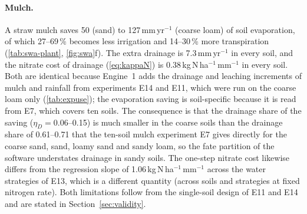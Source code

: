 \paragraph{Mulch.} A straw mulch saves 50 (sand) to 127\,mm\,yr$^{-1}$ (coarse loam) of soil evaporation, of which 27--69\,\% becomes less irrigation and 14--30\,\% more transpiration (\cref{tab:swa-plant}, \cref{fig:swa}f). The extra drainage is 7.3\,mm\,yr$^{-1}$ in every soil, and the nitrate cost of drainage (\cref{eq:kappaN}) is 0.38\,kg\,N\,ha$^{-1}$\,mm$^{-1}$ in every soil. Both are identical because Engine~1 adds the drainage and leaching increments of mulch and rainfall from experiments E14 and E11, which were run on the coarse loam only (\cref{tab:expuse}); the evaporation saving is soil-specific because it is read from E7, which covers ten soils. The consequence is that the drainage share of the saving ($\eta_D=0.06$--0.15) is much smaller in the coarse soils than the drainage share of 0.61--0.71 that the ten-soil mulch experiment E7 gives directly for the coarse sand, sand, loamy sand and sandy loam, so the fate partition of the software understates drainage in sandy soils. The one-step nitrate cost likewise differs from the regression slope of 1.06\,kg\,N\,ha$^{-1}$\,mm$^{-1}$ across the water strategies of E13, which is a different quantity (across soils and strategies at fixed nitrogen rate). Both limitations follow from the single-soil design of E11 and E14 and are stated in Section~\ref{sec:validity}.
